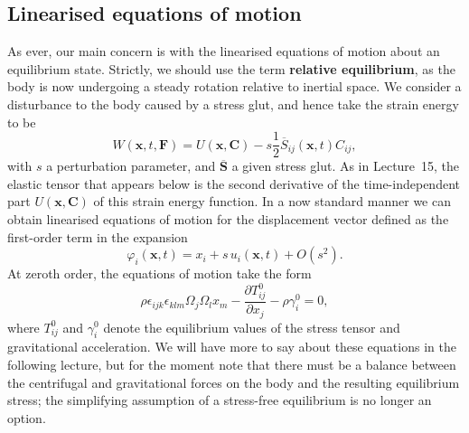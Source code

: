 \subsection*{Linearised equations of motion}

As ever, our main concern is with the linearised equations of motion about an equilibrium state.
Strictly, we should use the term \textbf{relative equilibrium}, as the body is now 
undergoing a steady rotation relative to inertial space. We consider a disturbance to the body
caused by a stress glut, and hence take the strain energy to be
\begin{equation}
W(\mathbf{x},t,\mathbf{F})=U(\mathbf{x},\mathbf{C})-s\frac{1}{2}\overline{S}_{ij}(\mathbf{x},t)C_{ij},
\label{eq:41}
\end{equation}
with $s$ a perturbation parameter, and $\overline{\mathbf{S}}$ a given stress glut. As in Lecture~15, the elastic tensor 
that appears below is the second derivative of the time-independent part $U(\mathbf{x},\mathbf{C})$ of this strain energy function. 
In a now standard manner we can 
obtain linearised equations of motion for the displacement vector defined as the first-order term in the expansion
\begin{equation}
\varphi_{i}(\mathbf{x},t)=x_{i}+s\,u_{i}(\mathbf{x},t)+O(s^{2}).
\label{eq:42}
\end{equation}
At zeroth order, the equations of motion take the form
\begin{equation}
\rho\epsilon_{ijk}\epsilon_{klm}\Omega_{j}\Omega_{l}x_{m}-\frac{\partial T_{ij}^{0}}{\partial x_{j}}-\rho\gamma_{i}^{0}=0,
\label{eq:43}
\end{equation}
where $T_{ij}^{0}$ and $\gamma_{i}^{0}$ denote the equilibrium values of the stress tensor and gravitational acceleration. 
We will have more to say about these equations in the following lecture, but for the moment note that there 
must be a balance between the centrifugal and gravitational forces on the body and the resulting equilibrium stress; the 
simplifying assumption of a stress-free equilibrium is no longer an option. 

